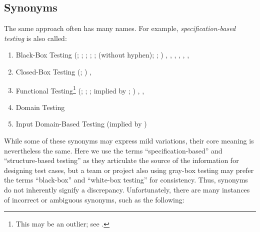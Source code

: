 \subsection{Synonyms}
\label{syns}
The same approach often has many names. For example,
\emph{specification-based testing} is also called:
\begin{enumerate}
      \item Black-Box Testing
            \ifnotpaper
                  (\citealp[p.~9]{IEEE2022}; \citeyear[p.~8]{IEEE2021};
                  \citeyear[p.~431]{IEEE2017}; \citealp[p.~5-10]{SWEBOK2024};
                  \citealpISTQB{}; \citealp[p.~46]{Firesmith2015} (without hyphen);
                  \citealp[p.~344]{SakamotoEtAl2013}; \citealp[p.~399]{vanVliet2000})
            \else
                  \cite[p.~431]{IEEE2017}, \cite{ISTQB}, \cite[p.~5-10]{SWEBOK2024},
                  \cite[p.~9]{IEEE2022}, \cite[p.~399]{vanVliet2000},
                  \cite[p.~8]{IEEE2021},
                  \cite[p.~344]{SakamotoEtAl2013}
            \fi
      \item Closed-Box Testing
            \ifnotpaper
                  (\citealp[p.~9]{IEEE2022}; \citeyear[p.~431]{IEEE2017})
            \else
                  \cite[p.~431]{IEEE2017}, \cite[p.~9]{IEEE2022}
            \fi
      \item Functional Testing\footnote{This may be an outlier; see
                  .}
            \ifnotpaper
                  (\citeyear[p.~196]{IEEE2017}; \citealp[p.~44]{Kam2008};
                  \citealp[p.~399]{vanVliet2000}; implied by \citeyear[p.~129]{IEEE2021};
                  \citeyear[p.~431]{IEEE2017})
            \else
                  \cite[p.~196]{IEEE2017}, \cite[p.~399]{vanVliet2000},
                  \cite[p.~44]{Kam2008}
            \fi
      \item Domain Testing \citep[p.~5-10]{SWEBOK2024}
            \ifnotpaper
      \item Input Domain-Based Testing (implied by \citep[p.~4-8]{SWEBOK2014})
            \fi
\end{enumerate}

While some of these synonyms may express mild variations, their core meaning
is nevertheless the same. Here we use the terms ``specification-based'' and
``structure-based testing'' as they articulate the source of the information
for designing test cases, but a team or project also using gray-box testing may
prefer the terms ``black-box'' and ``white-box testing'' for consistency.
Thus, synonyms do not inherently signify a discrepancy. Unfortunately, there
are many instances of incorrect or ambiguous synonyms, such as the following:

